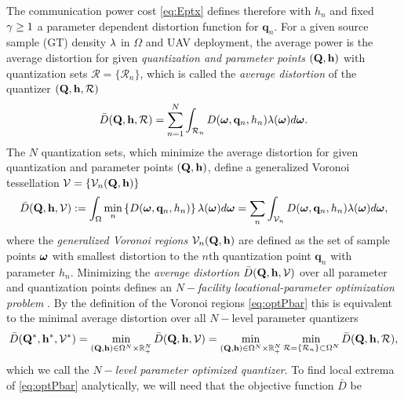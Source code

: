 \documentclass[smallabstract,smallcaptions]{dccpaper}
\renewcommand{\vp}{\mathbf q}
\renewcommand{\vP}{\mathbf Q}
\newcommand{\df}{\ensuremath{\lam}}         %
\newcommand{\bH}{\ensuremath{\vh}}          %
\newcommand{\Vor}{\ensuremath{\mathcal{V}}}         %
\newcommand{\Rset}{\ensuremath{\mathcal R}}
\newcommand{\Dis}{\ensuremath{D}}                    %
\newcommand{\AvDis}{\ensuremath{\bar{\Dis}}}         %
\begin{document}
The communication power cost \eqref{eq:Eptx} defines therefore with $h_n$ and fixed $\gamma\geq 1$ a parameter dependent
distortion function for $\vp_n$. For a given source sample (GT) density $\df$ in $\Omega$ and UAV deployment, the
average power is the average distortion for given \emph{quantization and parameter points} $(\vP,\vh)$ with quantization
sets $\Rset=\{\Rset_n\}$, which is called the \emph{average distortion} of the quantizer $(\vP,\vh,\Rset)$
%
\begin{equation}
 \AvDis(\vP,\vh,\Rset)
  = \sum_{n=1}^N \int_{\Rset_n} D(\vome,\vp_n,h_n)\lam(\vome)d\vome.
  \label{eq:Pbar}
\end{equation}
%
The $N$ quantization sets, which minimize the average distortion for 
given quantization and parameter points $(\vP,\vh)$, define a generalized Voronoi tessellation $\Vor=\{\Vor_n(\vP,\vh)\}$
%
\begin{align}
  \AvDis(\vP,\vh,\Vor)
  :=\int_{\Omega}\min_{n} \left\{ \Dis(\vome,\vp_n,h_n) \right\} \df(\vome)d\vome 
  =\sum_n\int_{\Vor_n}\Dis(\vome,\vp_n,h_n) \df(\vome)d\vome 
  \label{eq:optPbar},
\end{align}
%
where the \emph{generalized Voronoi regions} $\Vor_n(\vP,\vh)$ are defined as the set of sample points $\boldsymbol{ \omega}$ with
smallest distortion to the $n$th quantization point $\vp_n$ with parameter $h_n$.  Minimizing the
\emph{average distortion} $\AvDis(\vP,\vh,\Vor)$ over all parameter and quantization points defines an
\emph{$N-$facility locational-parameter optimization problem} \cite{GJ, GJcom18, GJ18,OBSC00}. By the definition of the
Voronoi regions \eqref{eq:optPbar} this is equivalent to the minimal average distortion over all $N-$level parameter
quantizers%
%
\begin{align}
  \AvDis(\vP^*,\vh^*,\Vor^*)
  = \min_{(\vP,\vh)\in\Ome^N\times\R_+^N} \AvDis(\vP,\vh,\Vor)
  = \min_{(\vP,\vh)\in\Ome^N\times\R_+^N} \min_{\Rset=\{\Rset_n\}\subset\Ome^N} \AvDis(\vP,\vh,\Rset), 
\label{eq:optquanteqoptdeploy}
\end{align}
%
which we call the \emph{$N-$level parameter optimized quantizer}.
%
%
%
To find local extrema of \eqref{eq:optPbar} analytically, we will need that the objective function $\AvDis$ be
\end{document}
